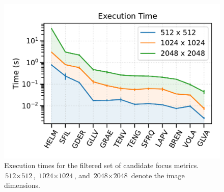 \begin{figure}[!tb]
    \centering
    \includegraphics[width=0.7\linewidth]{cppendix-A/figures/figA-6_timing.pdf}
    \caption{Execution times for the filtered set of candidate focus metrics.
    $\text{512}\times\text{512}$, $\text{1024}\times\text{1024}$, and $\text{2048}\times\text{2048}$ denote the image dimensions.}
    \label{fig:A.6_timing}
\end{figure}
